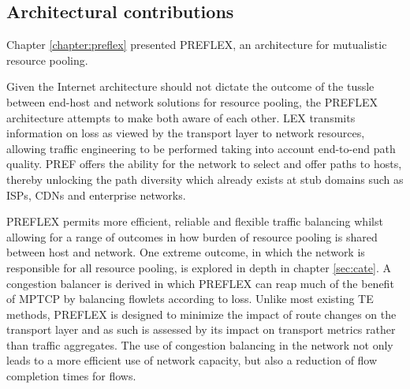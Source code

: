 \subsection{Architectural contributions}

Chapter \ref{chapter:preflex} presented \ac{PREFLEX}, an architecture for mutualistic resource pooling.


Given the Internet architecture should not dictate the outcome of the tussle between end-host and network solutions for resource pooling, the \ac{PREFLEX} architecture attempts to make both aware of each other.
\acf{LEX} transmits information on loss as viewed by the transport layer to network resources, allowing traffic engineering to be performed taking into account end-to-end path quality.
\acf{PREF} offers the ability for the network to select and offer paths to hosts, thereby unlocking the path diversity which already exists at stub domains such as \acp{ISP}, \acp{CDN} and enterprise networks.

\ac{PREFLEX} permits more efficient, reliable and flexible traffic balancing whilst allowing for a range of outcomes in how burden of resource pooling is shared between host and network.
One extreme outcome, in which the network is responsible for all resource pooling, is explored in depth in chapter \ref{sec:cate}.
A congestion balancer is derived in which \ac{PREFLEX} can reap much of the benefit of \ac{MPTCP} by balancing flowlets according to loss.
Unlike most existing \ac{TE} methods, \ac{PREFLEX} is designed to minimize the impact of route changes on the transport layer and as such is assessed by its impact on transport metrics rather than traffic aggregates.
The use of congestion balancing in the network not only leads to a more efficient use of network capacity, but also a reduction of flow completion times for flows.

